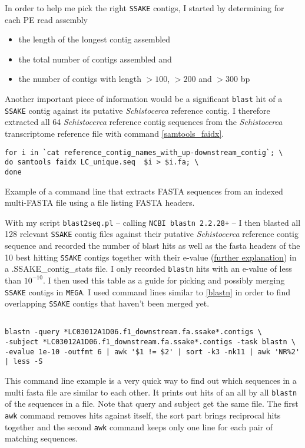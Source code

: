 \documentclass[a4paper,12pt,times,authoryear,twoside,print,index]{Classes/PhDThesisPSnPDF}\usepackage[]{graphicx}\usepackage[]{color}
\begin{document}
In order to help me pick the right \texttt{SSAKE} contigs, I started by determining for each PE read assembly
%
\begin{itemize}
\item the length of the longest contig assembled 
\item the total number of contigs assembled and
\item the number of contigs with length $>100$, $>200$ and $>300$ \gls{bp}
\end{itemize}
%
Another important piece of information would be a significant \texttt{blast} hit of a \texttt{SSAKE} contig against its putative \textit{Schistocerca} reference contig. I therefore extracted all 64 \textit{Schistocerca} reference contig sequences from the \textit{Schistocerca} transcriptome reference file with command \ref{samtools_faidx}.
%
\begin{cmd}
\captionsetup{type=cmd}
\begin{Verbatim}[fontsize=\scriptsize, formatcom=\color{darkgray}]
for i in `cat reference_contig_names_with_up-downstream_contig`; \
do samtools faidx LC_unique.seq  $i > $i.fa; \
done
\end{Verbatim}
\caption{\small Example of a command line that extracts FASTA sequences from an indexed multi-FASTA file using a file listing FASTA headers.}
\label{samtools_faidx}
\end{cmd}
%
With my script \texttt{blast2seq.pl} -- calling \texttt{NCBI blastn 2.2.28+} \citep{Camacho2009} -- I then blasted all 128 relevant \texttt{SSAKE} contig files against their putative \textit{Schistocerca} reference contig sequence and recorded the number of blast hits as well as the fasta headers of the 10 best hitting \texttt{SSAKE} contigs together with their \gls{e-value} (\href{http://blast.ncbi.nlm.nih.gov/Blast.cgi?CMD=Web&PAGE_TYPE=BlastDocs&DOC_TYPE=FAQ#expect}{further explanation}) in a \textsf{.SSAKE\_contig\_stats} file. I only recorded \texttt{blastn} hits with an \gls{e-value} of less than $10^{-10}$. I then used this table as a guide for picking and possibly merging \texttt{SSAKE} contigs in \texttt{MEGA}. I used command lines similar to \ref{blastn} in order to find overlapping \texttt{SSAKE} contigs that haven't been merged yet.
%
\begin{cmd}
\captionsetup{type=cmd}
\begin{Verbatim}[fontsize=\scriptsize, formatcom=\color{darkgray}]

blastn -query *LC03012A1D06.f1_downstream.fa.ssake*.contigs \
-subject *LC03012A1D06.f1_downstream.fa.ssake*.contigs -task blastn \
-evalue 1e-10 -outfmt 6 | awk '$1 != $2' | sort -k3 -nk11 | awk 'NR%2' | less -S
\end{Verbatim}
\caption{\small This command line example is a very quick way to find out which sequences in a multi fasta file are similar to each other. It prints out hits of an all by all \texttt{blastn} of the sequences in a file. Note that query and subject get the same file. The first \texttt{awk} command removes hits against itself, the sort part brings reciprocal hits together and the second \texttt{awk} command keeps only one line for each pair of matching sequences.}
\label{blastn}
\end{cmd}
\end{document}
